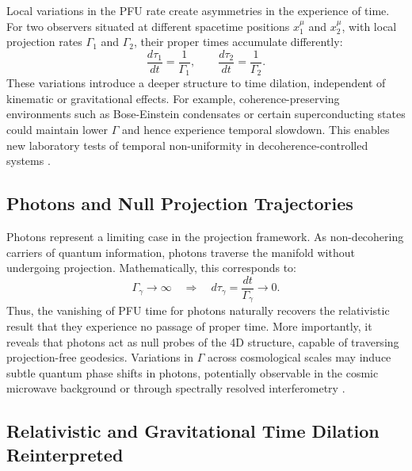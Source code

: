 \documentclass[12pt,a4paper]{article}
\numberwithin{equation}{section}
\begin{document}
Local variations in the PFU rate create asymmetries in the experience of time. For two observers situated at different spacetime positions $x_1^\mu$ and $x_2^\mu$, with local projection rates $\Gamma_1$ and $\Gamma_2$, their proper times accumulate differently:
\begin{equation}
\label{eq:delta_tau}
\frac{d\tau_1}{dt} = \frac{1}{\Gamma_1}, \qquad \frac{d\tau_2}{dt} = \frac{1}{\Gamma_2}.
\end{equation}
These variations introduce a deeper structure to time dilation, independent of kinematic or gravitational effects. For example, coherence-preserving environments such as Bose-Einstein condensates or certain superconducting states could maintain lower $\Gamma$ and hence experience temporal slowdown. This enables new laboratory tests of temporal non-uniformity in decoherence-controlled systems \cite{zurek_pointer_2003}.

\subsection{Photons and Null Projection Trajectories}

Photons represent a limiting case in the projection framework. As non-decohering carriers of quantum information, photons traverse the manifold without undergoing projection. Mathematically, this corresponds to:
\begin{equation}
\label{eq:photon_tau}
\Gamma_\gamma \to \infty \quad \Rightarrow \quad d\tau_\gamma = \frac{dt}{\Gamma_\gamma} \to 0.
\end{equation}
Thus, the vanishing of PFU time for photons naturally recovers the relativistic result that they experience no passage of proper time. More importantly, it reveals that photons act as null probes of the 4D structure, capable of traversing projection-free geodesics. Variations in $\Gamma$ across cosmological scales may induce subtle quantum phase shifts in photons, potentially observable in the cosmic microwave background or through spectrally resolved interferometry \cite{magueijo_cosmic_2008}.

\subsection{Relativistic and Gravitational Time Dilation Reinterpreted}
\end{document}
